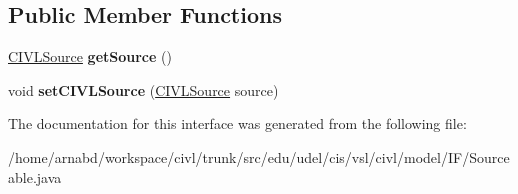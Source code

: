 \subsection*{Public Member Functions}
\begin{DoxyCompactItemize}
\item 
\hypertarget{interfaceedu_1_1udel_1_1cis_1_1vsl_1_1civl_1_1model_1_1IF_1_1Sourceable_a922a656dd3e47caa5a4fb767fe31016b}{}\hyperlink{interfaceedu_1_1udel_1_1cis_1_1vsl_1_1civl_1_1model_1_1IF_1_1CIVLSource}{C\+I\+V\+L\+Source} {\bfseries get\+Source} ()\label{interfaceedu_1_1udel_1_1cis_1_1vsl_1_1civl_1_1model_1_1IF_1_1Sourceable_a922a656dd3e47caa5a4fb767fe31016b}

\item 
\hypertarget{interfaceedu_1_1udel_1_1cis_1_1vsl_1_1civl_1_1model_1_1IF_1_1Sourceable_a2db1088c319d6a667043af314be8be7e}{}void {\bfseries set\+C\+I\+V\+L\+Source} (\hyperlink{interfaceedu_1_1udel_1_1cis_1_1vsl_1_1civl_1_1model_1_1IF_1_1CIVLSource}{C\+I\+V\+L\+Source} source)\label{interfaceedu_1_1udel_1_1cis_1_1vsl_1_1civl_1_1model_1_1IF_1_1Sourceable_a2db1088c319d6a667043af314be8be7e}

\end{DoxyCompactItemize}


The documentation for this interface was generated from the following file\+:\begin{DoxyCompactItemize}
\item 
/home/arnabd/workspace/civl/trunk/src/edu/udel/cis/vsl/civl/model/\+I\+F/Sourceable.\+java\end{DoxyCompactItemize}
